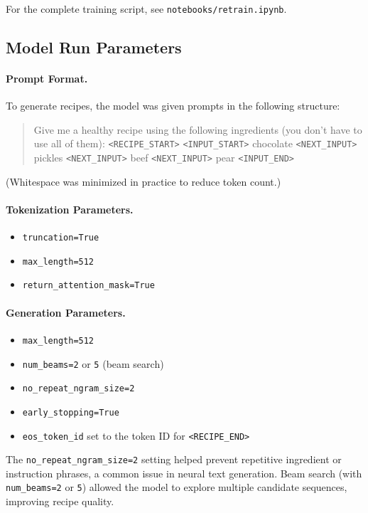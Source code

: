 For the complete training script, see \texttt{notebooks/retrain.ipynb}.

\subsection{Model Run Parameters}
\paragraph{Prompt Format.}

To generate recipes, the model was given prompts in the following structure:

\begin{quote}
	Give me a healthy recipe using the following ingredients (you don't have to use all of them): \texttt{<RECIPE\_START>} \texttt{<INPUT\_START>} chocolate \texttt{<NEXT\_INPUT>} pickles \texttt{<NEXT\_INPUT>} beef \texttt{<NEXT\_INPUT>} pear \texttt{<INPUT\_END>}
\end{quote}

(Whitespace was minimized in practice to reduce token count.)

\paragraph{Tokenization Parameters.}
\begin{itemize}
	\item \texttt{truncation=True}
	\item \texttt{max\_length=512}
	\item \texttt{return\_attention\_mask=True}
\end{itemize}

\paragraph{Generation Parameters.}
\begin{itemize}
	\item \texttt{max\_length=512}
	\item \texttt{num\_beams=2} or \texttt{5} (beam search)
	\item \texttt{no\_repeat\_ngram\_size=2}
	\item \texttt{early\_stopping=True}
	\item \texttt{eos\_token\_id} set to the token ID for \texttt{<RECIPE\_END>}
\end{itemize}

The \texttt{no\_repeat\_ngram\_size=2} setting helped prevent repetitive ingredient or instruction phrases, a common issue in neural text generation. Beam search (with \texttt{num\_beams=2} or \texttt{5}) allowed the model to explore multiple candidate sequences, improving recipe quality.

